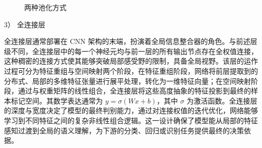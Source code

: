 \begin{figure}[ht]
  \centering
  \caption{两种池化方式}
  \label{fig:pooling}
\end{figure}

3） 全连接层

全连接层通常部署在 CNN 架构的末端，扮演着全局信息整合器的角色。与前述层级不同，全连接层中的每一个神经元均与前一层的所有输出节点存在全权值连接，这种稠密的连接方式使其能够突破局部感受野的限制，具备全局视野。该层的运作过程可分为特征重组与空间映射两个阶段，在特征重组阶段，网络将前层提取到的分布式、局部的多维特征张量进行展平处理，转化为一维特征向量；在空间映射阶段，通过与权重矩阵的线性组合，全连接层将这些高度抽象的特征投影到最终的样本标记空间。其数学表达通常为 $y = \sigma(Wx + b)$，其中 $\sigma$ 为激活函数。全连接层的深度与宽度决定了模型的最终判别能力，通过对连接权值的迭代优化，网络能够学习到不同特征之间的复杂非线性组合逻辑。这一设计确保了模型能从局部的特征感知过渡到全局的语义理解，为下游的分类、回归或识别任务提供最终的决策依据。

